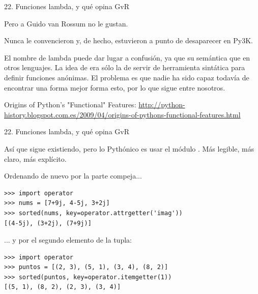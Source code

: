 \documentclass[14pt]{beamer}
\begin{document}
\begin{frame}[fragile]{22. \large Funciones lambda, y qué opina GvR}
  \begin{alertblock}{}
    \large
    \centering
    Pero a Guido van Rossum no le gustan.
  \end{alertblock}

  \small
  \begin{center}
    Nunca le convencieron y, de hecho, estuvieron a punto de desaparecer en Py3K.
  \end{center}

  \footnotesize
  \begin{center}
    El nombre de lambda puede dar lugar a confusión, ya que su
    semántica  que en otros lenguajes. La
    idea de  era sólo la de servir de herramienta
    sintática para definir funciones anónimas. El problema es que
    nadie ha sido capaz todavía de encontrar una forma mejor forma
    esto, por lo que  sigue entre nosotros.
   \end{center}

  \begin{block}
    {\centering Origins of Python's "Functional" Features:}
    \centering \url{http://python-history.blogspot.com.es/2009/04/origins-of-pythons-functional-features.html}
  \end{block}
\end{frame}

\begin{frame}[fragile]{22. \large Funciones lambda, y qué opina GvR}
  \small
  \begin{block}{}
    \centering
    Así que  sigue existiendo, pero lo Pythónico es
    usar el módulo .  Más legible, más claro, más
    explícito.
  \end{block}

  \footnotesize
  \begin{exampleblock}
    {Ordenando de nuevo por la parte compeja...}
    \begin{lstlisting}
>>> import operator
>>> nums = [7+9j, 4-5j, 3+2j]
>>> sorted(nums, key=operator.attrgetter('imag'))
[(4-5j), (3+2j), (7+9j)]
    \end{lstlisting}
  \end{exampleblock}

  \begin{exampleblock}
    {... y por el segundo elemento de la tupla:}
    \begin{lstlisting}
>>> import operator
>>> puntos = [(2, 3), (5, 1), (3, 4), (8, 2)]
>>> sorted(puntos, key=operator.itemgetter(1))
[(5, 1), (8, 2), (2, 3), (3, 4)]
    \end{lstlisting}
  \end{exampleblock}
\end{frame}
\end{document}
